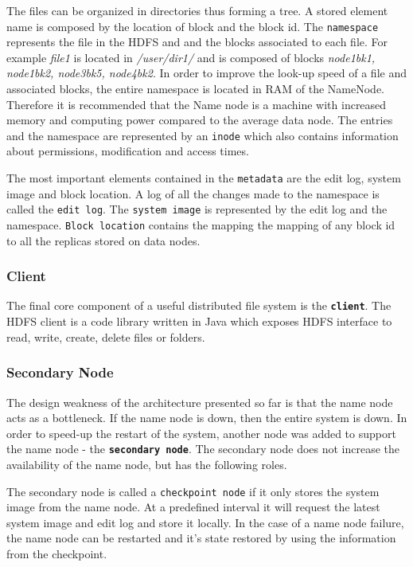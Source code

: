 \documentclass{sig-alternate}
\begin{document}
The files can be organized in directories thus forming a tree. A stored element name is composed by the location of block and the block id.
The \texttt{namespace} represents the file in the HDFS and and the blocks associated to each file. For example \textit{file1} is located in \textit{/user/dir1/} and is composed of blocks \textit{node1bk1, node1bk2, node3bk5, node4bk2}.
In order to improve the look-up speed of a file and associated blocks, the entire namespace is located in RAM of the NameNode. Therefore it is recommended that the Name node is a machine with increased memory and computing power compared to the average data node.
The entries and the namespace are represented by an \texttt{inode} which also contains information about permissions, modification and access times.

The most important elements contained in the \texttt{metadata} are the edit log, system image and block location.
A log of all the changes made to the namespace is called the \texttt{edit log}. The \texttt{system image} is represented by the edit log and the namespace. \texttt{Block location} contains the mapping the mapping of any block id to all the replicas stored on data nodes.

\subsubsection{Client}
The final core component of a useful distributed file system is the \textbf{\texttt{client}}.
The HDFS client is a code library written in Java which 
exposes HDFS interface to
read, write, create, delete files or folders. 

\subsubsection{Secondary Node}
The design weakness of the architecture presented so far is that the name node acts as a bottleneck. 
If the name node is down, then the entire system is down.
In order to speed-up the restart of the system, another node was added to support the name node - the \textbf{\texttt{secondary node}}. The secondary node does not increase the availability of the name node, but has the following roles.

The secondary node is called a \texttt{checkpoint node} if it only stores the system image from the name node. At a predefined interval it will request the latest system image and edit log and store it locally. In the case of a name node failure, the name node can be restarted and it's state restored by using the information from the checkpoint. 
\end{document}
